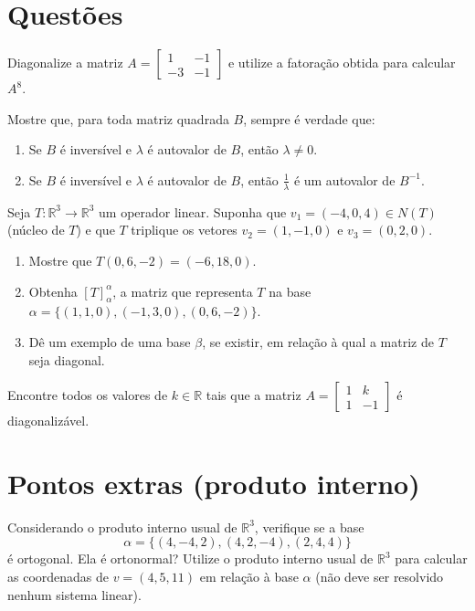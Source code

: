 \documentclass[12pt,a4paper]{article}
\newcommand{\fixme}{{\color{red}(...)}}
\newcommand*\R{\mathbb{R}}
\begin{document}
\section*{Questões}
\begin{ExerciseList}
\Exercise[title={2,5}]
Diagonalize a matriz $A = \begin{bmatrix}
1 & -1 \\ -3 & -1
\end{bmatrix}$ e utilize a fatoração obtida para calcular $A^8$.
\Answer \fixme

\Exercise[title={2,5}] Mostre que, para toda matriz quadrada $B$, sempre é verdade que:
\begin{enumerate}
\item Se $B$ é inversível e $\lambda$ é autovalor de $B$, então $\lambda \neq 0$.
\item Se $B$ é inversível e $\lambda$ é autovalor de $B$, então $\frac{1}{\lambda}$ é um autovalor de $B^{-1}$.
\end{enumerate}

\Answer \fixme
\Exercise[title={2,5}] Seja $T: \R^3 \to \R^3$ um operador linear. Suponha que $v_1 = (-4,0,4) \in N(T)$ (núcleo de $T$) e que $T$ triplique os vetores $v_2 = (1,-1,0)$ e $v_3 = (0,2,0)$.
\begin{enumerate}
\item Mostre que $T(0,6,-2) = (-6,18,0)$.
\item Obtenha $[T]_\alpha^\alpha$, a matriz que representa $T$ na base $\alpha = \{ (1,1,0), (-1,3,0), (0,6,-2) \}$.
\item Dê um exemplo de uma base $\beta$, se existir, em relação à qual a matriz de $T$ seja diagonal.
\end{enumerate}

\Answer \fixme
\Exercise[title={2,5}] Encontre todos os valores de $k \in \R$ tais que a matriz $A = \begin{bmatrix}
1 & k \\ 1 & -1
\end{bmatrix}$ é diagonalizável.
\Answer \fixme
\end{ExerciseList}

\section*{Pontos extras (produto interno)}
\begin{ExerciseList}
\Exercise[title={1,5}] Considerando o produto interno usual de $\R^3$, verifique se a base
\[
\alpha = \{ (4,-4,2), (4,2,-4), (2,4,4)  \}
\]
é ortogonal. Ela é ortonormal?
\Answer \fixme
\Exercise[title={1,5}] Utilize o produto interno usual de $\R^3$ para calcular as coordenadas de $v = (4,5,11)$ em relação à base $\alpha$ (não deve ser resolvido nenhum sistema linear).
\Answer \fixme

\end{ExerciseList}

\end{document}
